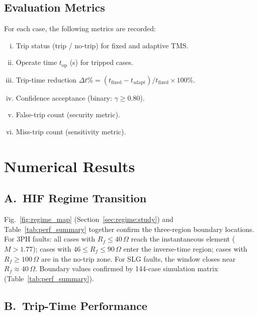 \documentclass[10pt,journal,twoside]{IEEEtran}
\newcommand{\Rf}{R_{\!f}}
\begin{document}
\subsection{Evaluation Metrics}
\label{sec:system:metrics}

For each case, the following metrics are recorded:
\begin{enumerate}[(i)]
  \item Trip status (trip / no-trip) for fixed and adaptive TMS.
  \item Operate time $t_{\mathrm{op}}$ (s) for tripped cases.
  \item Trip-time reduction
        $\Delta t\% = (t_{\mathrm{fixed}} - t_{\mathrm{adapt}})/
        t_{\mathrm{fixed}} \times 100\%$.
  \item Confidence acceptance (binary: $\gamma \geq 0.80$).
  \item False-trip count (security metric).
  \item Miss-trip count (sensitivity metric).
\end{enumerate}

\section{Numerical Results}
\label{sec:results}

\subsection{A.\ HIF Regime Transition}
\label{sec:results:regime}

Fig.~\ref{fig:regime_map} (Section~\ref{sec:regime:study}) and
Table~\ref{tab:perf_summary} together confirm the three-region boundary
locations.  For 3PH faults: all cases with $\Rf \leq 40\,\Omega$ reach the
instantaneous element ($M > 1.77$); cases with $46 \leq \Rf \leq 90\,\Omega$
enter the inverse-time region; cases with $\Rf \geq 100\,\Omega$ are in the
no-trip zone.  For SLG faults, the window closes near $\Rf \approx 40\,\Omega$.
Boundary values confirmed by 144-case simulation matrix (Table~\ref{tab:perf_summary}).

\subsection{B.\ Trip-Time Performance}
\label{sec:results:triptime}
\end{document}
